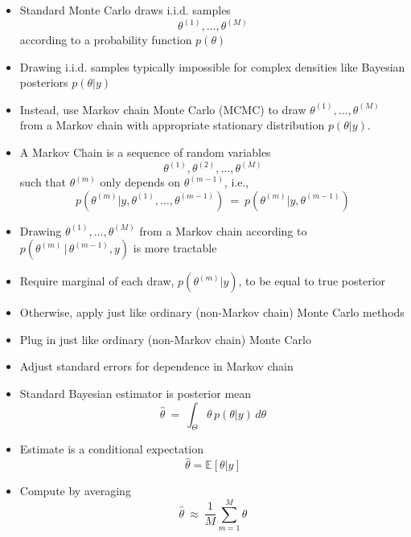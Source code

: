 \documentclass[10pt]{report}
\begin{document}


%
\begin{itemize}
\item Standard Monte Carlo draws i.i.d. samples
\[
\theta^{(1)}, \ldots, \theta^{(M)}
\]
according to a probability function $p(\theta)$
\item Drawing i.i.d. samples typically impossible for
  complex densities like Bayesian posteriors $p(\theta|y)$
\item Instead, use Markov chain Monte Carlo (MCMC) to
  draw $\theta^{(1)}, \ldots, \theta^{(M)}$ from a Markov chain
  with appropriate stationary distribution $p(\theta | y)$.
\end{itemize}


%
\begin{itemize}
\item A Markov Chain is a sequence of random variables
\[
\theta^{(1)},
  \theta^{(2)}, \ldots, \theta^{(M)}
\]
such that $\theta^{(m)}$ only depends on $\theta^{(m-1)}$, i.e.,
\[
p(\theta^{(m)} | y, \theta^{(1)}, \ldots, \theta^{(m-1)})
\ = \
p(\theta^{(m)} | y, \theta^{(m-1)})
\]
\item Drawing $\theta^{(1)}, \ldots, \theta^{(M)}$ from a Markov chain
  according to \\ $p(\theta^{(m)} \, | \, \theta^{(m-1)}, y)$ is more tractable
\item Require marginal of each draw, $p(\theta^{(m)}|y)$,
  to be equal to true posterior
\item Otherwise, apply just like ordinary (non-Markov chain) Monte Carlo methods
\end{itemize}


%
\begin{itemize}
\item Plug in just like ordinary (non-Markov chain) Monte Carlo
\item Adjust standard errors for dependence in Markov chain
\end{itemize}


%
\begin{itemize}
\item Standard Bayesian estimator is posterior mean
\[
\hat{\theta}  \ =  \ \int_{\Theta} \theta \, p(\theta|y) \, d\theta
\]
\item Estimate is a conditional expectation
\[
\hat{\theta} = \mathbb{E}[\theta|y]
\]
\item Compute by averaging
\[
\hat{\theta} \ \approx \ \frac{1}{M} \sum_{m=1}^M \theta
\]
\end{itemize}
\end{document}

